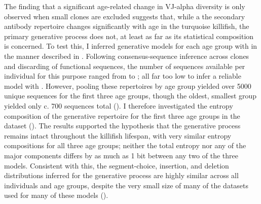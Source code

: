 The finding that a significant age-related change in VJ-alpha diversity is only observed when small clones are excluded suggests that, while a the secondary antibody repertoire changes significantly with age in the turquoise killifish, the primary generative process does not, at least as far as its statistical composition is concerned. To test this, I inferred generative models for each age group with  in the manner described in . Following consensus-sequence inference across clones and discarding of functional sequences, the number of sequences available per individual for this purpose ranged from  to ; all far too low to infer a reliable model with . However, pooling these repertoires by age group yielded over 5000 unique sequences for the first three age groups, though the oldest, smallest group yielded only c. 700 sequences total (). I therefore investigated the entropy composition of the generative repertoire for the first three age groups in the dataset (). The results supported the hypothesis that the generative process remains intact throughout the killifish lifespan, with very similar entropy compositions for all three age groups; neither the total entropy nor any of the major components differs by as much as 1 bit between any two of the three models. Consistent with this, the segment-choice, insertion, and deletion distributions inferred for the generative process are highly similar across all individuals and age groups, despite the very small size of many of the datasets used for many of these models ().

